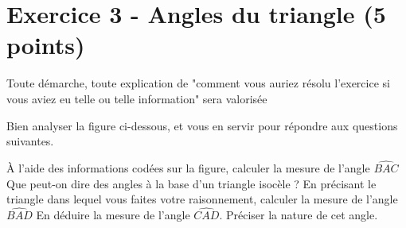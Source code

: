 \documentclass[answers]{exam}
\begin{document}
\pagebreak

\section*{Exercice 3 - Angles du triangle (5 points)}

\begin{Indication}
Toute démarche, toute explication de "comment vous auriez résolu l'exercice si vous aviez eu telle ou telle information" sera valorisée
\end{Indication}

Bien analyser la figure ci-dessous, et vous en servir pour répondre aux questions suivantes.


\begin{questions}
  \question[1.5] \just À l’aide des informations codées sur la figure, calculer la mesure de l'angle $\widehat{BAC}$
\question[0.5] Que peut-on dire des angles à la base d'un triangle isocèle ?
\question[1.5] \just En précisant le triangle dans lequel vous faites votre raisonnement, calculer la mesure de l'angle $\widehat{BAD}$
\question[1.5] \just En déduire la mesure de l'angle $\widehat{CAD}$. Préciser la nature de cet angle.
\end{questions}
\end{document}
